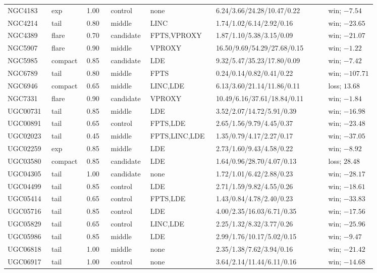 \documentclass[11pt]{article}
\begin{document}
\begin{landscape}
\begin{longtable}{@{}p{0.105\linewidth}p{0.070\linewidth}p{0.060\linewidth}p{0.085\linewidth}p{0.130\linewidth}p{0.280\linewidth}p{0.120\linewidth}@{}}
NGC4183 & exp & 1.00 & control & none & 6.24/3.66/24.28/10.47/0.22 & win; $-7.54$ \\
NGC4214 & tail & 0.80 & middle & LINC & 1.74/1.02/6.14/2.92/0.16 & win; $-23.65$ \\
NGC4389 & flare & 0.70 & candidate & FPTS,VPROXY & 1.87/1.10/5.38/3.15/0.09 & win; $-21.07$ \\
NGC5907 & flare & 0.90 & middle & VPROXY & 16.50/9.69/54.29/27.68/0.15 & win; $-1.22$ \\
NGC5985 & compact & 0.85 & candidate & LDE & 9.32/5.47/35.23/17.80/0.09 & win; $-7.42$ \\
NGC6789 & tail & 0.80 & middle & FPTS & 0.24/0.14/0.82/0.41/0.22 & win; $-107.71$ \\
NGC6946 & compact & 0.65 & middle & LINC,LDE & 6.13/3.60/21.14/11.86/0.11 & loss; $13.68$ \\
NGC7331 & flare & 0.90 & candidate & VPROXY & 10.49/6.16/37.61/18.84/0.11 & win; $-1.84$ \\
UGC00731 & tail & 0.85 & middle & LDE & 3.52/2.07/14.72/5.91/0.39 & win; $-16.98$ \\
UGC00891 & tail & 0.65 & control & FPTS,LDE & 2.65/1.56/9.79/4.45/0.37 & win; $-23.48$ \\
UGC02023 & tail & 0.45 & middle & FPTS,LINC,LDE & 1.35/0.79/4.17/2.27/0.17 & win; $-37.05$ \\
UGC02259 & exp & 0.85 & middle & LDE & 2.73/1.60/9.43/4.58/0.22 & win; $-8.92$ \\
UGC03580 & compact & 0.85 & candidate & LDE & 1.64/0.96/28.70/4.07/0.13 & loss; $28.48$ \\
UGC04305 & tail & 1.00 & candidate & none & 1.72/1.01/6.42/2.88/0.23 & win; $-28.17$ \\
UGC04499 & tail & 0.85 & control & LDE & 2.71/1.59/9.82/4.55/0.26 & win; $-18.61$ \\
UGC05414 & tail & 0.65 & control & FPTS,LDE & 1.43/0.84/4.78/2.40/0.23 & win; $-33.83$ \\
UGC05716 & tail & 0.85 & control & LDE & 4.00/2.35/16.03/6.71/0.35 & win; $-17.56$ \\
UGC05829 & tail & 0.65 & control & LINC,LDE & 2.25/1.32/8.32/3.77/0.26 & win; $-25.96$ \\
UGC05986 & tail & 0.85 & middle & LDE & 2.99/1.76/10.17/5.02/0.15 & win; $-9.47$ \\
UGC06818 & tail & 1.00 & middle & none & 2.35/1.38/7.62/3.94/0.16 & win; $-21.42$ \\
UGC06917 & tail & 1.00 & control & none & 3.64/2.14/11.44/6.11/0.16 & win; $-14.68$ \\

\end{longtable}
\end{landscape}
\end{document}
